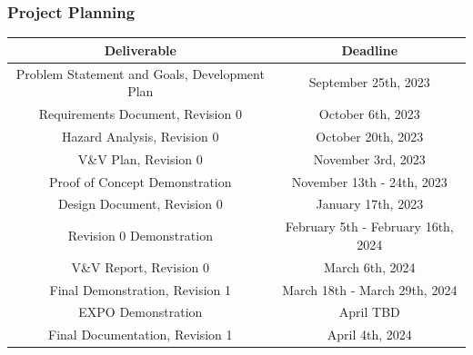 \documentclass[12pt]{article}
\begin{document}
\subsubsection{Project Planning}

    \begin{center}
    \begin{tabular}{ |c|c| } 
    \hline
    \textbf{Deliverable} & \textbf{Deadline} \\ 
    \hline
    Problem Statement and Goals, Development Plan & September 25th, 2023 \\ 
    Requirements Document, Revision 0  & October 6th, 2023 \\
    Hazard Analysis, Revision 0 & October 20th, 2023  \\ 
    V\&V Plan, Revision 0 & November 3rd, 2023 \\ 
    Proof of Concept Demonstration & November 13th - 24th, 2023 \\
    Design Document, Revision 0 & January 17th, 2023 \\
    Revision 0 Demonstration & February 5th - February 16th, 2024\\
    V\&V Report, Revision 0 & March 6th, 2024 \\
    Final Demonstration, Revision 1 & March 18th - March 29th, 2024 \\
    EXPO Demonstration & April TBD \\
    Final Documentation, Revision 1 & April 4th, 2024 \\
    \hline
    \end{tabular}
    \end{center}
\end{document}
